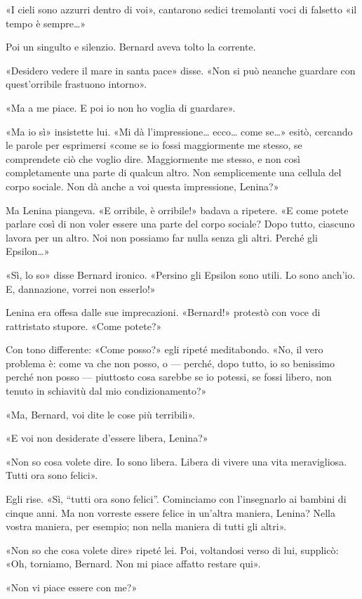 \documentclass[
a5paper, %
10pt, %
twoside, 
onecolumn, %
openany, %
]{memoir}
\begin{document}
«I cieli sono azzurri dentro di voi», cantarono sedici tremolanti voci di falsetto «il tempo è sempre…»

Poi un singulto e silenzio. Bernard aveva tolto la corrente.

«Desidero vedere il mare in santa pace» disse. «Non si può neanche guardare con quest’orribile frastuono intorno».

«Ma a me piace. E poi io non ho voglia di guardare».

«Ma io sì» insistette lui. «Mi dà l’impressione… ecco… come se…» esitò, cercando le parole per esprimersi «come se io fossi maggiormente me stesso, se comprendete ciò che voglio dire. Maggiormente me stesso, e non così completamente una parte di qualcun altro. Non semplicemente una cellula del corpo sociale. Non dà anche a voi questa impressione, Lenina?»

Ma Lenina piangeva. «E orribile, è orribile!» badava a ripetere. «E come potete parlare così di non voler essere una parte del corpo sociale? Dopo tutto, ciascuno lavora per un altro. Noi non possiamo far nulla senza gli altri. Perché gli Epsilon…»

«Sì, lo so» disse Bernard ironico. «Persino gli Epsilon sono utili. Lo sono anch’io. E, dannazione, vorrei non esserlo!»

Lenina era offesa dalle sue imprecazioni. «Bernard!» protestò con voce di rattristato stupore. «Come potete?»

Con tono differente: «Come posso?» egli ripeté meditabondo. «No, il vero problema è: come va che non posso, o — perché, dopo tutto, io so benissimo perché non posso — piuttosto cosa sarebbe se io potessi, se fossi libero, non tenuto in schiavitù dal mio condizionamento?»

«Ma, Bernard, voi dite le cose più terribili».

«E voi non desiderate d’essere libera, Lenina?»

«Non so cosa volete dire. Io sono libera. Libera di vivere una vita meravigliosa. Tutti ora sono felici».

Egli rise. «Sì, “tutti ora sono felici”. Cominciamo con l’insegnarlo ai bambini di cinque anni. Ma non vorreste essere felice in un’altra maniera, Lenina? Nella vostra maniera, per esempio; non nella maniera di tutti gli altri».

«Non so che cosa volete dire» ripeté lei. Poi, voltandosi verso di lui, supplicò: «Oh, torniamo, Bernard. Non mi piace affatto restare qui».

«Non vi piace essere con me?»
\end{document}
